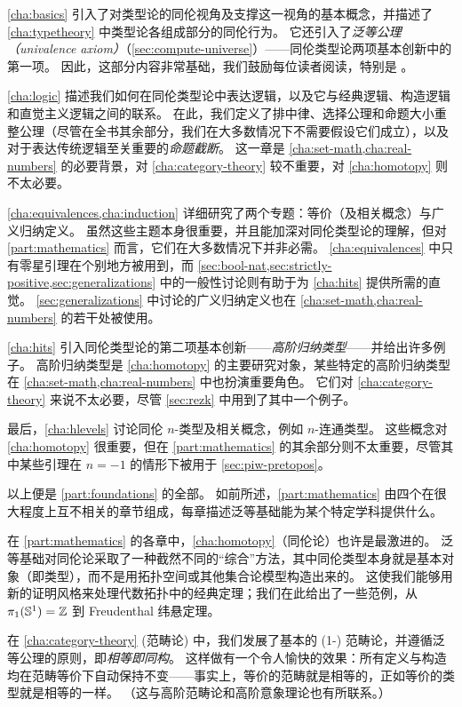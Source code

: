 \cref{cha:basics} 引入了对类型论的同伦视角及支撑这一视角的基本概念，并描述了 \cref{cha:typetheory} 中类型论各组成部分的同伦行为。
它还引入了\emph{泛等公理（univalence axiom）}（\cref{sec:compute-universe}）——同伦类型论两项基本创新中的第一项。
因此，这部分内容非常基础，我们鼓励每位读者阅读，特别是 。

\cref{cha:logic} 描述我们如何在同伦类型论中表达逻辑，以及它与经典逻辑、构造逻辑和直觉主义逻辑之间的联系。
在此，我们定义了排中律、选择公理和命题大小重整公理（尽管在全书其余部分，我们在大多数情况下不需要假设它们成立），以及对于表达传统逻辑至关重要的\emph{命题截断}。
这一章是 \cref{cha:set-math,cha:real-numbers} 的必要背景，对 \cref{cha:category-theory} 较不重要，对 \cref{cha:homotopy} 则不太必要。

\cref{cha:equivalences,cha:induction} 详细研究了两个专题：等价（及相关概念）与广义归纳定义。
虽然这些主题本身很重要，并且能加深对同伦类型论的理解，但对 \cref{part:mathematics} 而言，它们在大多数情况下并非必需。
\cref{cha:equivalences} 中只有零星引理在个别地方被用到，而 \cref{sec:bool-nat,sec:strictly-positive,sec:generalizations} 中的一般性讨论则有助于为 \cref{cha:hits} 提供所需的直觉。
\cref{sec:generalizations} 中讨论的广义归纳定义也在 \cref{cha:set-math,cha:real-numbers} 的若干处被使用。

\cref{cha:hits} 引入同伦类型论的第二项基本创新——\emph{高阶归纳类型}——并给出许多例子。
高阶归纳类型是 \cref{cha:homotopy} 的主要研究对象，某些特定的高阶归纳类型在 \cref{cha:set-math,cha:real-numbers} 中也扮演重要角色。
它们对 \cref{cha:category-theory} 来说不太必要，尽管 \cref{sec:rezk} 中用到了其中一个例子。

最后，\cref{cha:hlevels} 讨论同伦 $n$-类型及相关概念，例如 $n$-连通类型。
这些概念对 \cref{cha:homotopy} 很重要，但在 \cref{part:mathematics} 的其余部分则不太重要，尽管其中某些引理在 $n=-1$ 的情形下被用于 \cref{sec:piw-pretopos}。

以上便是 \cref{part:foundations} 的全部。
如前所述，\cref{part:mathematics} 由四个在很大程度上互不相关的章节组成，每章描述泛等基础能为某个特定学科提供什么。

在 \cref{part:mathematics} 的各章中，\cref{cha:homotopy}（同伦论）也许是最激进的。
泛等基础对同伦论采取了一种截然不同的``综合''方法，其中同伦类型本身就是基本对象（即类型），而不是用拓扑空间或其他集合论模型构造出来的。
这使我们能够用新的证明风格来处理代数拓扑中的经典定理；我们在此给出了一些范例，从 $\pi_1(\mathbb{S}^1)=\mathbb{Z}$ 到 Freudenthal 纬悬定理。

在 \cref{cha:category-theory} (范畴论) 中，我们发展了基本的 (1-) 范畴论，并遵循泛等公理的原则，即\emph{相等即同构}。
这样做有一个令人愉快的效果：所有定义与构造均在范畴等价下自动保持不变——事实上，等价的范畴就是相等的，正如等价的类型就是相等的一样。
（这与高阶范畴论和高阶意象理论也有所联系。）

